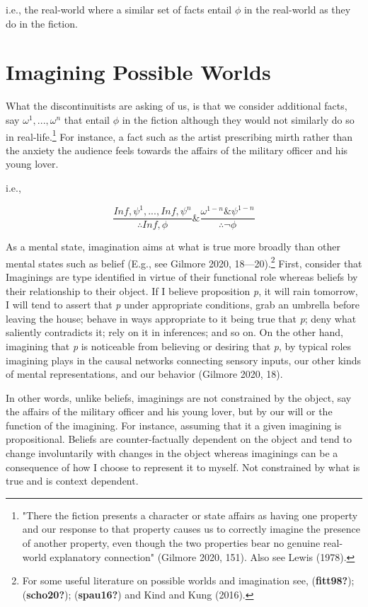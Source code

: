 \documentclass[12pt]{book}
\theoremstyle{definition}
\theoremstyle{remark}
\begin{document}
\noindent i.e., the real-world where a similar set of facts entail \(\phi\) in the real-world as they do in the fiction.

\section{Imagining Possible Worlds}\label{imagining-possible-worlds}

What the discontinuitists are asking of us, is that we consider additional facts, say \(\omega^{1}, . . ., \omega^{n}\) that entail \(\phi\) in the fiction although they would not similarly do so in real-life.\footnote{"There the fiction presents a character or state affairs as having one property and our response to that property causes us to correctly imagine the presence of another property, even though the two properties bear no genuine real-world explanatory connection" (Gilmore 2020, 151). Also see Lewis (1978).} For instance, a fact such as the artist prescribing mirth rather than the anxiety the audience feels towards the affairs of the military officer and his young lover.

\noindent i.e.,

\[\frac{In f, \psi^{1}, . . ., In f, \psi^{n}}{\therefore In f, \phi} \& \frac{\omega^{1-n} \& \psi^{1-n}}{\therefore\neg\phi}\]

As a mental state, imagination aims at what is true more broadly than other mental states such as belief (E.g., see Gilmore 2020, 18---20).\footnote{For some useful literature on possible worlds and imagination see, (\textbf{fitt98?}); (\textbf{scho20?}); (\textbf{spau16?}) and Kind and Kung (2016).} First, consider that Imaginings are type identified in virtue of their functional role whereas beliefs by their relationship to their object. If I believe proposition \emph{p}, it will rain tomorrow, I will tend to assert that \emph{p} under appropriate conditions, grab an umbrella before leaving the house; behave in ways appropriate to it being true that \emph{p}; deny what saliently contradicts it; rely on it in inferences; and so on. On the other hand, imagining that \emph{p} is noticeable from believing or desiring that \emph{p}, by typical roles imagining plays in the causal networks connecting sensory inputs, our other kinds of mental representations, and our behavior (Gilmore 2020, 18).

In other words, unlike beliefs, imaginings are not constrained by the object, say the affairs of the military officer and his young lover, but by our will or the function of the imagining. For instance, assuming that it a given imagining is propositional. Beliefs are counter-factually dependent on the object and tend to change involuntarily with changes in the object whereas imaginings can be a consequence of how I choose to represent it to myself. Not constrained by what is true and is context dependent.
\end{document}
